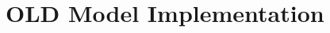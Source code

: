 \chapter[OLD Model Implementation]{OLD Model Implementation}
\label{appendix-model-implementation}











